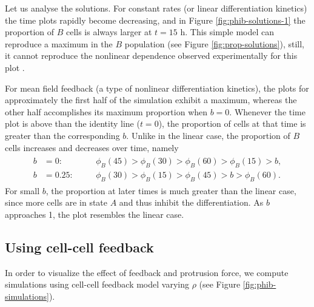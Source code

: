 Let us analyse the solutions. For constant rates (or linear differentiation kinetics) the time plots rapidly  become decreasing, and in Figure \ref{fig:phib-solutions-1} the proportion of $B$ cells is always larger at $t=15\text{ h}$. This simple model can reproduce a maximum in the $B$ population (see Figure \ref{fig:prop-solutions}), still, it cannot reproduce the nonlinear dependence observed experimentally for this plot \parencite{Oriola_2025}.

For mean field feedback (a type of nonlinear differentiation kinetics), the plots for approximately the first half of the simulation exhibit a maximum, whereas the other half accomplishes its maximum proportion when $b=0$. Whenever the time plot is above than the identity line ($t=0$), the proportion of cells at that time is greater than the corresponding $b$. Unlike in the linear case, the proportion of $B$ cells increases and decreases over time, namely
\begin{align*}
    \begin{aligned}
        b &= 0: &\quad &\phi_B(45) > \phi_B(30) > \phi_B(60) > \phi_B(15) > b, \\
        b &= 0.25: &\quad &\phi_B(30) > \phi_B(15) > \phi_B(45) > b > \phi_B(60).
    \end{aligned}
\end{align*}
For small $b$, the proportion at later times is much greater than the linear case, since more cells are in state $A$ and thus inhibit the differentiation. As $b$ approaches 1, the plot resembles the linear case.


\subsection{Using cell-cell feedback}

In order to visualize the effect of feedback and protrusion force, we compute simulations using cell-cell feedback model varying $\rho$ (see Figure \ref{fig:phib-simulations}).

